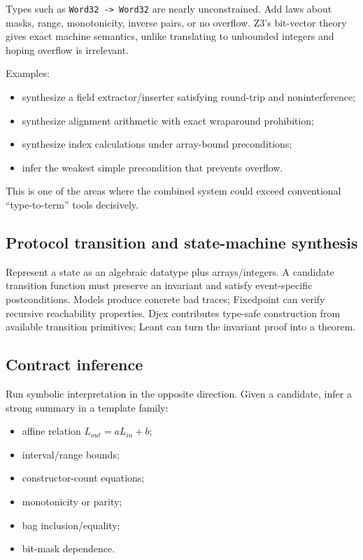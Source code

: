 \documentclass[11pt,oneside]{article}
\newcommand{\code}[1]{\texttt{#1}}
\begin{document}
Types such as \code{Word32 -> Word32} are nearly unconstrained. Add laws about masks,
range, monotonicity, inverse pairs, or no overflow. Z3's bit-vector theory gives exact
machine semantics, unlike translating to unbounded integers and hoping overflow is
irrelevant.

Examples:

\begin{itemize}
  \item synthesize a field extractor/inserter satisfying round-trip and noninterference;
  \item synthesize alignment arithmetic with exact wraparound prohibition;
  \item synthesize index calculations under array-bound preconditions;
  \item infer the weakest simple precondition that prevents overflow.
\end{itemize}

This is one of the areas where the combined system could exceed conventional
``type-to-term'' tools decisively.

\subsection{Protocol transition and state-machine synthesis}

Represent a state as an algebraic datatype plus arrays/integers. A candidate transition
function must preserve an invariant and satisfy event-specific postconditions. Models
produce concrete bad traces; Fixedpoint can verify recursive reachability properties.
Djex contributes type-safe construction from available transition primitives; Leant
can turn the invariant proof into a theorem.

\subsection{Contract inference}

Run symbolic interpretation in the opposite direction. Given a candidate, infer a
strong summary in a template family:

\begin{itemize}
  \item affine relation $L_{out}=aL_{in}+b$;
  \item interval/range bounds;
  \item constructor-count equations;
  \item monotonicity or parity;
  \item bag inclusion/equality;
  \item bit-mask dependence.
\end{itemize}
\end{document}
